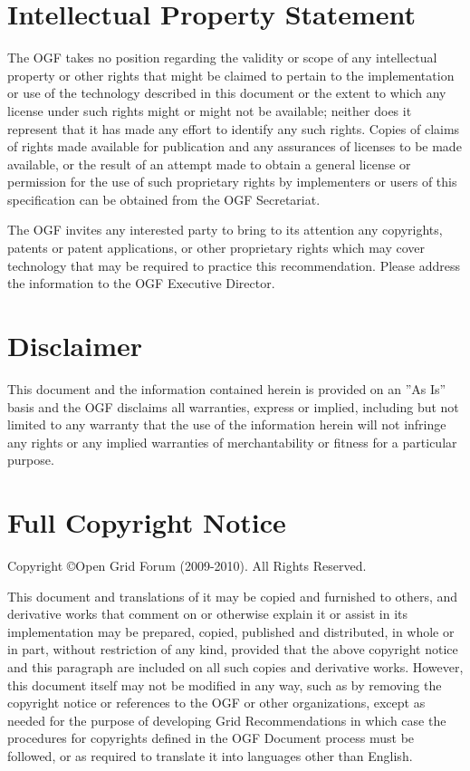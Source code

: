 \documentclass[10pt,a4paper]{article}
\begin{document}
\section{Intellectual Property Statement}

The OGF takes no position regarding the validity or scope of any intellectual property or other rights that might be claimed to pertain to the implementation or use of the technology described in this document or the extent to which any license under such rights might or might not be available; neither does it represent that it has made any effort to identify any such rights. Copies of claims of rights made available for publication and any assurances of licenses to be made available, or the result of an attempt made to obtain a general license or permission for the use of such proprietary rights by implementers or users of this specification can be obtained from the OGF Secretariat.

The OGF invites any interested party to bring to its attention any copyrights, patents or patent applications, or other proprietary rights which may cover technology that may be required to practice this recommendation. Please address the information to the OGF Executive Director.

\section{Disclaimer}

This document and the information contained herein is provided on an ''As Is'' basis and the OGF disclaims all warranties, express or implied, including but not limited to any warranty that the use of the information herein will not infringe any rights or any implied warranties of merchantability or fitness for a particular purpose.

\section{Full Copyright Notice}

Copyright \copyright Open Grid Forum (2009-2010). All Rights Reserved.

This document and translations of it may be copied and furnished to others, and derivative works that comment on or otherwise explain it or assist in its implementation may be prepared, copied, published and distributed, in whole or in part, without restriction of any kind, provided that the above copyright notice and this paragraph are included on all such copies and derivative works. However, this document itself may not be modified in any way, such as by removing the copyright notice or references to the OGF or other organizations, except as needed for the purpose of developing Grid Recommendations in which case the procedures for copyrights defined in the OGF Document process must be followed, or as required to translate it into languages other than English.
\end{document}
